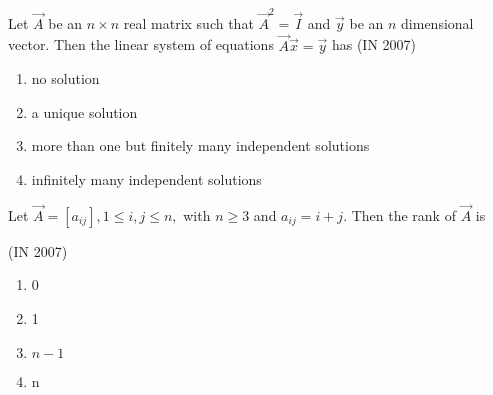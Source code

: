  \item Let $\vec{A}$ be an $n \times n$ real matrix such that $\vec{A}^2 = \vec{I}$ and $\vec{y}$ be an $n$ dimensional vector. Then the linear system of equations $\vec{A}\vec{x} = \vec{y}$ has  
\hfill(IN 2007)
\begin{enumerate}
\item no solution
\item a unique solution
\item more than one but finitely many independent solutions
\item infinitely many independent solutions
\end{enumerate}
\item Let $\vec{A} = [a_{ij}], 1 \leq i,j \leq n,$ with $n \geq 3$ and $a_{ij} = i+j$. Then the rank of $\vec{A}$ is  

\hfill(IN 2007)
	\begin{multicols}{4}
\begin{enumerate}
\item 0  
\item 1  
\item $n-1$  
\item n  
\end{enumerate}
\end{multicols}

